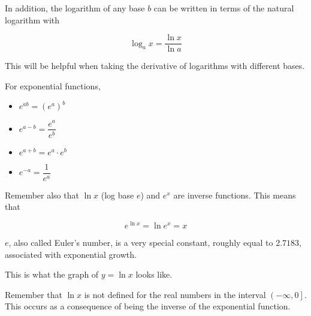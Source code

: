 In addition, the logarithm of any base \( b \) can be written in terms of the natural logarithm with

\[ \log_a{x} = \dfrac{\ln{x}}{\ln{a}} \]

This will be helpful when taking the derivative of logarithms with different bases.

For exponential functions,

\begin{multicols}{2}
    \begin{itemize}
        \item \( e^{ab} = \left( e^a \right)^b \)
        \item \( e^{a - b} = \dfrac{e^a}{e^b} \)
        \item \( e^{a + b} = e^a \cdot e^b \)
        \item \( e^{-a} = \dfrac{1}{e^a} \)
    \end{itemize}
\end{multicols}

Remember also that \( \ln{x} \) (log base \( e \)) and \( e^x \) are inverse functions. This means that

\[ e^{\ln{x}} = \ln{e^x} = x \]

\( e \), also called Euler's number, is a very special constant, roughly equal to \( 2.7183 \), associated with exponential growth.

This is what the graph of \( y = \ln{x} \) looks like.

\begin{center}
\end{center}

Remember that \( \ln{x} \) is not defined for the real numbers in the interval \( \left( -\infty, 0 \right] \). This occurs as a consequence of being the inverse of the exponential function.

